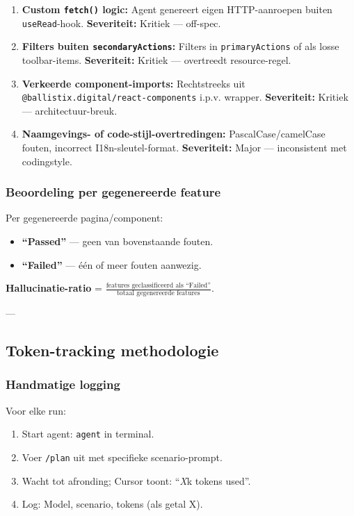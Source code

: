 \begin{enumerate}
  \item \textbf{Custom \texttt{fetch()} logic:} Agent genereert eigen HTTP-aanroepen buiten \texttt{useRead}-hook. \textbf{Severiteit:} Kritiek — off-spec.
  
  \item \textbf{Filters buiten \texttt{secondaryActions}:} Filters in \texttt{primaryActions} of als losse toolbar-items. \textbf{Severiteit:} Kritiek — overtreedt resource-regel.
  
  \item \textbf{Verkeerde component-imports:} Rechtstreeks uit \texttt{@ballistix.digital/react-components} i.p.v. wrapper. \textbf{Severiteit:} Kritiek — architectuur-breuk.
  
  \item \textbf{Naamgevings- of code-stijl-overtredingen:} PascalCase/camelCase fouten, incorrect I18n-sleutel-format. \textbf{Severiteit:} Major — inconsistent met codingstyle.
\end{enumerate}

\subsubsection{Beoordeling per gegenereerde feature}

Per gegenereerde pagina/component:
\begin{itemize}
  \item \textbf{``Passed''} — geen van bovenstaande fouten.
  \item \textbf{``Failed''} — één of meer fouten aanwezig.
\end{itemize}

\noindent
\textbf{Hallucinatie-ratio} = \(\frac{\text{features geclassificeerd als ``Failed''}}{\text{totaal gegenereerde features}}\).

---

\subsection{Token-tracking methodologie}

\subsubsection{Handmatige logging}

Voor elke run:
\begin{enumerate}
  \item Start agent: \texttt{agent} in terminal.
  \item Voer \texttt{/plan} uit met specifieke scenario-prompt.
  \item Wacht tot afronding; Cursor toont: ``\textit{X}k tokens used''.
  \item Log: Model, scenario, tokens (als getal X).
\end{enumerate}

